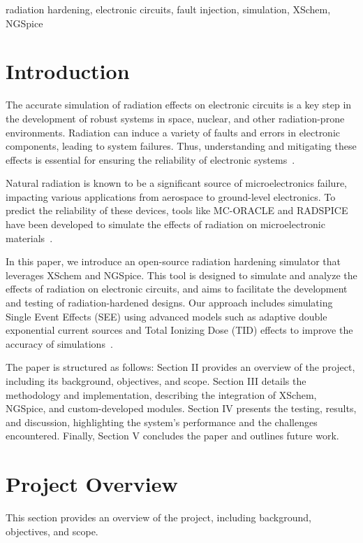 \documentclass[conference]{IEEEtran}
\begin{document}
    \begin{IEEEkeywords}
        radiation hardening, electronic circuits, fault injection, simulation, XSchem, NGSpice
    \end{IEEEkeywords}


    \section{Introduction}\label{sec:introduction}
    The accurate simulation of radiation effects on electronic circuits is a key step in the development of robust systems in space, nuclear, and other radiation-prone environments.
    Radiation can induce a variety of faults and errors in electronic components, leading to system failures.
    Thus, understanding and mitigating these effects is essential for ensuring the reliability of electronic systems~\cite{Wrobel2011, Florian1986}.

    Natural radiation is known to be a significant source of microelectronics failure, impacting various applications from aerospace to ground-level electronics.
    To predict the reliability of these devices, tools like MC-ORACLE and RADSPICE have been developed to simulate the effects of radiation on microelectronic materials~\cite{Wrobel2011, Florian1986}.

    In this paper, we introduce an open-source radiation hardening simulator that leverages XSchem and NGSpice.
    This tool is designed to simulate and analyze the effects of radiation on electronic circuits, and aims to facilitate the development and testing of radiation-hardened designs.
    Our approach includes simulating Single Event Effects (SEE) using advanced models such as adaptive double exponential current sources and Total Ionizing Dose (TID) effects to improve the accuracy of simulations~\cite{Pepper1990}.

    The paper is structured as follows: Section II provides an overview of the project, including its background, objectives, and scope.
    Section III details the methodology and implementation, describing the integration of XSchem, NGSpice, and custom-developed modules.
    Section IV presents the testing, results, and discussion, highlighting the system's performance and the challenges encountered.
    Finally, Section V concludes the paper and outlines future work.


    \section{Project Overview}\label{sec:project-overview}
    This section provides an overview of the project, including background, objectives, and scope.
\end{document}

